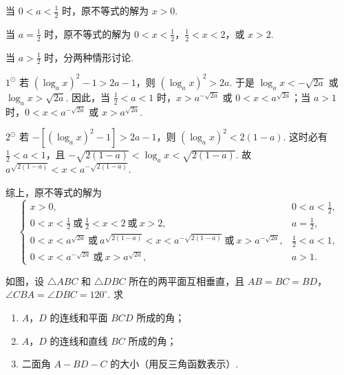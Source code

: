 \begin{solution}
当 \(0 < a < \frac{1}{2}\) 时，原不等式的解为 \(x > 0\).

当 \(a = \frac{1}{2}\) 时，原不等式的解为 \(0 < x < \frac{1}{2}\)，\(\frac{1}{2} < x < 2\)，或 \(x > 2\).

当 \(a > \frac{1}{2}\) 时，分两种情形讨论.

\(1^{\odot}\) 若 \(\left(\log_a x\right)^2 - 1 > 2a - 1\)，则 \(\left(\log_a x\right)^2 > 2a\). 于是 \(\log_a x < -\sqrt{2a}\) 或 \(\log_a x > \sqrt{2a}\). 因此，当 \(\frac{1}{2} < a < 1\) 时，\(x > a^{-\sqrt{2a}}\) 或 \(0 < x < a^{\sqrt{2a}}\)；当 \(a > 1\) 时，\(0 < x < a^{-\sqrt{2a}}\) 或 \(x > a^{\sqrt{2a}}\).

\(2^{\odot}\) 若 \(-\left[\left(\log_a x\right)^2 - 1\right] > 2a - 1\)，则 \(\left(\log_a x\right)^2 < 2(1 - a)\). 这时必有 \(\frac{1}{2} < a < 1\)，且 \(-\sqrt{2(1 - a)} < \log_a x < \sqrt{2(1 - a)}\). 故 \(a^{\sqrt{2(1 - a)}} < x < a^{-\sqrt{2(1 - a)}}\).

综上，原不等式的解为
\[
\begin{cases}
x > 0, & 0 < a < \frac{1}{2},\\[4pt]
0 < x < \frac{1}{2}\ \text{或}\ \frac{1}{2} < x < 2\ \text{或}\ x > 2, & a = \frac{1}{2},\\[4pt]
0 < x < a^{\sqrt{2a}}\ \text{或}\ a^{\sqrt{2(1 - a)}} < x < a^{-\sqrt{2(1 - a)}}\ \text{或}\ x > a^{-\sqrt{2a}}, & \frac{1}{2} < a < 1,\\[4pt]
0 < x < a^{-\sqrt{2a}}\ \text{或}\ x > a^{\sqrt{2a}}, & a > 1.
\end{cases}
\]
\end{solution}

\begin{problem}
如图，设 \(\triangle ABC\) 和 \(\triangle DBC\) 所在的两平面互相垂直，且 \(AB = BC = BD\)，\(\angle CBA = \angle DBC = 120^{\circ}\). 求

\begin{enumerate}
\item \(A\)，\(D\) 的连线和平面 \(BCD\) 所成的角；
\item \(A\)，\(D\) 的连线和直线 \(BC\) 所成的角；
\item 二面角 \(A-BD-C\) 的大小（用反三角函数表示）.
\end{enumerate}

\end{problem}


